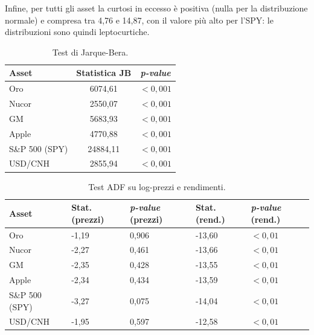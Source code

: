 Infine, per tutti gli asset la curtosi in eccesso è positiva (nulla per la distribuzione normale) e compresa tra 4,76 e 14,87, con il valore più alto per l'SPY: 
le distribuzioni sono quindi leptocurtiche.

\begin{table}[H]
    \centering
    \footnotesize
    \begin{tabular}{ l c c }
        \toprule
        \textbf{Asset} & \textbf{Statistica JB} & \textbf{\emph{p-value}} \\
        \midrule
        Oro & 6074,61 & $< 0,001$ \\ \midrule
        Nucor & 2550,07 & $< 0,001$ \\ \midrule
        GM & 5683,93 & $< 0,001$ \\ \midrule
        Apple & 4770,88 & $< 0,001$ \\ \midrule
        S\&P 500 (SPY) & 24884,11 & $< 0,001$ \\ \midrule
        USD/CNH & 2855,94 & $< 0,001$ \\
        \bottomrule
    \end{tabular}
    \vspace{5pt}
    \caption[Test di Jarque-Bera]{Test di Jarque-Bera.}
    \label{tab:jarque-bera}
\end{table}

\begin{table}[H]
    \centering
    \footnotesize
    \begin{tabular}{ p{} p{} p{} p{} p{} }
        \toprule
        \textbf{Asset} & \textbf{Stat. (prezzi)} & \textbf{\emph{p-value} (prezzi)} & \textbf{Stat. (rend.)} & \textbf{\emph{p-value} (rend.)} \\
        \midrule
        Oro & -1,19 & 0,906 & -13,60 & $< 0,01$ \\ \midrule
        Nucor & -2,27 & 0,461 & -13,66 & $< 0,01$ \\ \midrule
        GM & -2,35 & 0,428 & -13,55 & $< 0,01$ \\ \midrule
        Apple & -2,34 & 0,434 & -13,59 & $< 0,01$ \\ \midrule
        S\&P 500 (SPY) & -3,27 & 0,075 & -14,04 & $< 0,01$ \\ \midrule
        USD/CNH & -1,95 & 0,597 & -12,58 & $< 0,01$ \\
        \bottomrule
    \end{tabular}
    \vspace{5pt}
    \caption[Test ADF su log-prezzi e rendimenti]{Test ADF su log-prezzi e rendimenti.}
    \label{tab:test-adf}
\end{table}


